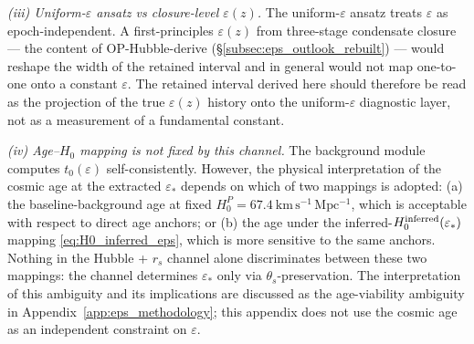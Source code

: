\textit{(iii) Uniform-$\varepsilon$ ansatz vs closure-level
$\varepsilon(z)$.}
The uniform-$\varepsilon$ ansatz treats $\varepsilon$ as
epoch-independent. A first-principles $\varepsilon(z)$ from
three-stage condensate closure --- the content of OP-Hubble-derive
(\S\ref{subsec:eps_outlook_rebuilt}) --- would reshape the width
of the retained interval and in general would not map one-to-one
onto a constant $\varepsilon$. The retained interval derived here
should therefore be read as the projection of the true
$\varepsilon(z)$ history onto the uniform-$\varepsilon$
diagnostic layer, not as a measurement of a fundamental constant.

\textit{(iv) Age--$H_0$ mapping is not fixed by this channel.}
The background module computes $t_0(\varepsilon)$
self-consistently. However, the physical interpretation of the
cosmic age at the extracted $\varepsilon_*$ depends on which of
two mappings is adopted: (a) the baseline-background age at fixed
$H_0^P = 67.4~\mathrm{km\,s^{-1}\,Mpc^{-1}}$, which is acceptable
with respect to direct age anchors; or (b) the age under the
inferred-$H_0^{\rm inferred}(\varepsilon_*)$ mapping
\eqref{eq:H0_inferred_eps}, which is more sensitive to the same
anchors. Nothing in the Hubble + $r_s$ channel alone discriminates
between these two mappings: the channel determines $\varepsilon_*$
only via $\theta_s$-preservation. The interpretation of this
ambiguity and its implications are discussed as the age-viability
ambiguity in Appendix~\ref{app:eps_methodology}; this appendix
does not use the cosmic age as an independent constraint on
$\varepsilon$.

